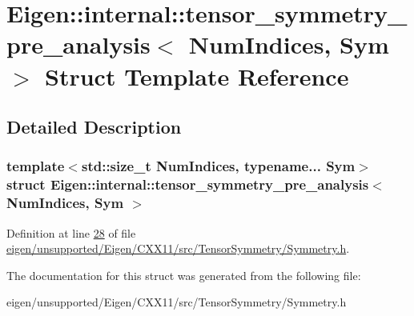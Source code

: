 \hypertarget{struct_eigen_1_1internal_1_1tensor__symmetry__pre__analysis}{}\section{Eigen\+:\+:internal\+:\+:tensor\+\_\+symmetry\+\_\+pre\+\_\+analysis$<$ Num\+Indices, Sym $>$ Struct Template Reference}
\label{struct_eigen_1_1internal_1_1tensor__symmetry__pre__analysis}


\subsection{Detailed Description}
\subsubsection*{template$<$std\+::size\+\_\+t Num\+Indices, typename... Sym$>$\newline
struct Eigen\+::internal\+::tensor\+\_\+symmetry\+\_\+pre\+\_\+analysis$<$ Num\+Indices, Sym $>$}



Definition at line \hyperlink{eigen_2unsupported_2_eigen_2_c_x_x11_2src_2_tensor_symmetry_2_symmetry_8h_source_l00028}{28} of file \hyperlink{eigen_2unsupported_2_eigen_2_c_x_x11_2src_2_tensor_symmetry_2_symmetry_8h_source}{eigen/unsupported/\+Eigen/\+C\+X\+X11/src/\+Tensor\+Symmetry/\+Symmetry.\+h}.



The documentation for this struct was generated from the following file\+:\begin{DoxyCompactItemize}
\item 
eigen/unsupported/\+Eigen/\+C\+X\+X11/src/\+Tensor\+Symmetry/\+Symmetry.\+h\end{DoxyCompactItemize}
